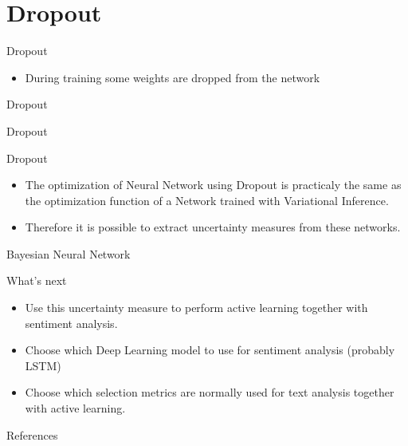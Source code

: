 \documentclass[10pt]{beamer}
\begin{document}
\section{Dropout}

\begin{frame}[fragile]{Dropout}
\begin{itemize}
\item During training some weights are dropped from the network
\end{itemize}
\end{frame}

\begin{frame}[fragile]{Dropout}
    
\end{frame}

\begin{frame}[fragile]{Dropout}
    
\end{frame}

\begin{frame}[fragile]{Dropout}
\begin{itemize}
    \item The optimization of Neural Network using \alert{Dropout} is practicaly the same
        as the optimization function of a Network trained with \alert{Variational
        Inference}.
    \vspace{0.5cm}
    \item Therefore it is possible to extract uncertainty measures from these
        networks.
\end{itemize}
\end{frame}

\begin{frame}[fragile]{Bayesian Neural Network}
    
\end{frame}

\begin{frame}[fragile]{What's next}
\begin{itemize}
    \item Use this uncertainty measure to perform active learning together with
        sentiment analysis.
    \vspace{0.5cm}
    \item Choose which Deep Learning model to use for sentiment analysis (probably
        LSTM)
    \vspace{0.5cm}
    \item Choose which selection metrics are normally used for text analysis
        together with active learning.
\end{itemize}
\end{frame}

\begin{frame}[allowframebreaks]{References}
  
  
\end{frame}
\end{document}
